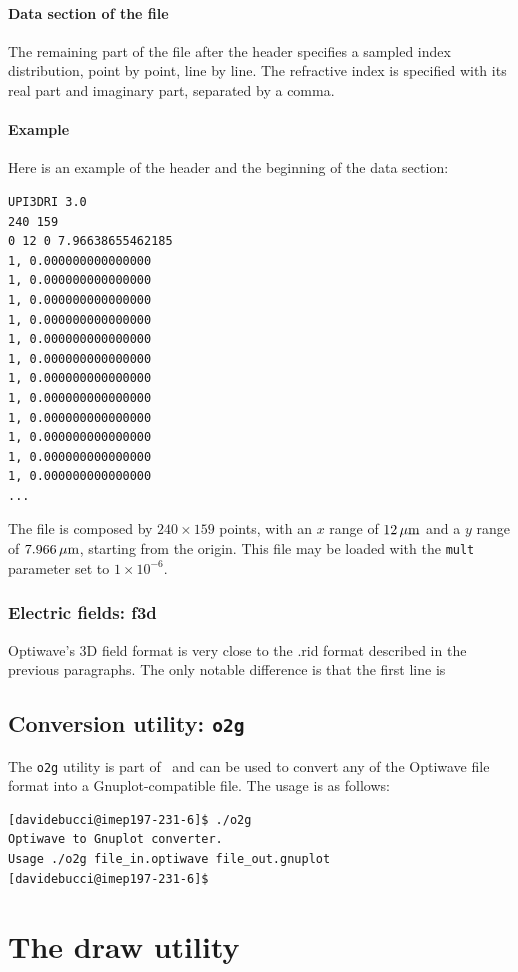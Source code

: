 \subsubsection{Data section of the file}
The remaining part of the file after the header specifies a sampled index distribution, point by point, line by line. The refractive index is specified with its real part and  imaginary part, separated by a comma.
    
\subsubsection{Example}
Here is an example of the header and the beginning of the data section: 

\begin{verbatim}    
UPI3DRI 3.0
240 159
0 12 0 7.96638655462185
1, 0.000000000000000
1, 0.000000000000000
1, 0.000000000000000
1, 0.000000000000000
1, 0.000000000000000
1, 0.000000000000000
1, 0.000000000000000
1, 0.000000000000000
1, 0.000000000000000
1, 0.000000000000000
1, 0.000000000000000
1, 0.000000000000000
...  
\end{verbatim}
The file is composed by $240\times 159$ points, with an $x$ range of $12\,\mathrm{\mu m}$ 
and a $y$ range of $7.966\,\mathrm{\mu m}$, starting from the origin. This file may be loaded with the \lstinline!mult! parameter set to $1\times 10^{-6}$.

\subsection{Electric fields: f3d}
\label{sec_format_f3d}
Optiwave's 3D field format is very close to the .rid format described in the previous paragraphs. The only notable difference is that the first line is 


\section{Conversion utility: \texttt{o2g}}
The \texttt{o2g} utility is part of \afmm\ and can be used to convert any of the Optiwave file format into a Gnuplot-compatible file.
The usage is as follows:
\begin{lstlisting}
[davidebucci@imep197-231-6]$ ./o2g 
Optiwave to Gnuplot converter. 
Usage ./o2g file_in.optiwave file_out.gnuplot
[davidebucci@imep197-231-6]$
\end{lstlisting}




\chapter{The \textsf{draw} utility}
\label{ch_draw}
